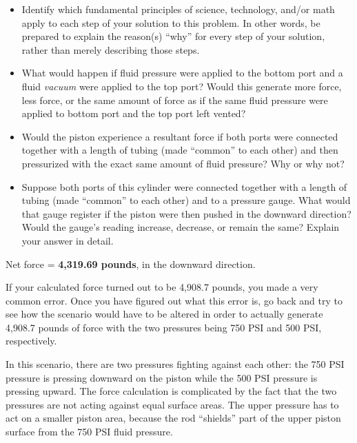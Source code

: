 \begin{itemize}
\item{} Identify which fundamental principles of science, technology, and/or math apply to each step of your solution to this problem.  In other words, be prepared to explain the reason(s) ``why'' for every step of your solution, rather than merely describing those steps.
\item{} What would happen if fluid pressure were applied to the bottom port and a fluid {\it vacuum} were applied to the top port?  Would this generate more force, less force, or the same amount of force as if the same fluid pressure were applied to bottom port and the top port left vented?
\item{} Would the piston experience a resultant force if both ports were connected together with a length of tubing (made ``common'' to each other) and then pressurized with the exact same amount of fluid pressure?  Why or why not?
\item{} Suppose both ports of this cylinder were connected together with a length of tubing (made ``common'' to each other) and to a pressure gauge.  What would that gauge register if the piston were then pushed in the downward direction?  Would the gauge's reading increase, decrease, or remain the same?  Explain your answer in detail.
\end{itemize}







Net force = {\bf 4,319.69 pounds}, in the downward direction.

\vskip 10pt

If your calculated force turned out to be 4,908.7 pounds, you made a very common error.  Once you have figured out what this error is, go back and try to see how the scenario would have to be altered in order to actually generate 4,908.7 pounds of force with the two pressures being 750 PSI and 500 PSI, respectively.







In this scenario, there are two pressures fighting against each other: the 750 PSI pressure is pressing downward on the piston while the 500 PSI pressure is pressing upward.  The force calculation is complicated by the fact that the two pressures are not acting against equal surface areas.  The upper pressure has to act on a smaller piston area, because the rod ``shields'' part of the upper piston surface from the 750 PSI fluid pressure. 

